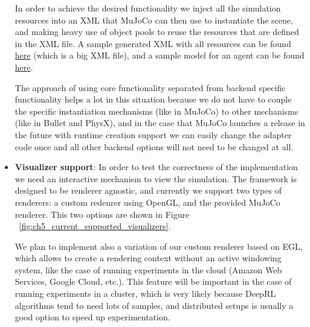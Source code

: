 \begin{itemize}
          In order to achieve the desired functionality we inject all the simulation
          resources into an XML that MuJoCo can then use to instantiate the scene,
          and making heavy use of object pools to reuse the resources that are
          defined in the XML file. A sample generated XML with all resources can
          be found \href{https://github.com/wpumacay/tysocMjc/blob/master/res/xml/workspace.xml}{here}
          (which is a big XML file), and a sample model for an agent can be found
          \href{https://github.com/wpumacay/tysocMjc/blob/master/res/templates/mjcf/walker.xml}{here}.

          The approach of using core functionality separated from backend specific
          functionality helps a lot in this situation because we do not have to
          couple the specific instantiation mechanisms (like in MuJoCo) to other
          mechanisms (like in Bullet and PhysX), and in the case that MuJoCo launches
          a release in the future with runtime creation support we can easily change
          the adapter code once and all other backend options will not need to be
          changed at all.

    \item \textbf{Visualizer support}: In order to test the correctness of the
          implementation we need an interactive mechanism to view the simulation.
          The framework is designed to be renderer agnostic, and currently we support
          two types of renderers: a custom redenrer using OpenGL, and the provided
          MuJoCo renderer. This two options are shown in Figure ~\ref{fig:ch5_current_supported_visualizers}.

          We plan to implement also a variation of our custom renderer based on
          EGL, which allows to create a rendering context without an active windowing
          system, like the case of running experiments in the cloud (Amazon Web Services,
          Google Cloud, etc.). This feature will be important in the case of running
          experiments in a cluster, which is very likely because DeepRL algorithms
          tend to need lots of samples, and distributed setups is usually a good
          option to speed up experimentation.

          \figSupportedVisualizers

\end{itemize}

